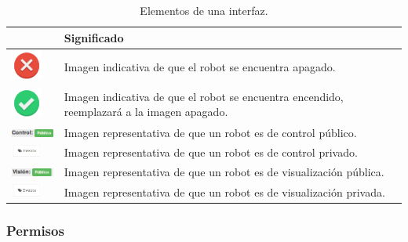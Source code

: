 \begin{table}[H]
  \begin{center}
    \begin{tabular}{|p{2cm}|p{10cm}|}
      \hline
      \centering{Elemento} & \qquad \quad Significado \\
      \hline
      \includegraphics[width=1cm]{imagenes/manual-usuario/offline.png} & Imagen indicativa de que el robot se encuentra apagado. \\
      \hline
      \includegraphics[width=1cm]{imagenes/manual-usuario/online.png} & Imagen indicativa de que el robot se encuentra encendido, reemplazará a la imagen apagado. \\
      \hline
      \includegraphics[width=2cm]{imagenes/manual-usuario/control-publico.png} & Imagen representativa de que un robot es de control público. \\
      \hline
      \includegraphics[width=1cm]{imagenes/manual-usuario/nuevo-evento.png} & Imagen representativa de que un robot es de control privado. \\
      \hline
      \includegraphics[width=2cm]{imagenes/manual-usuario/vision-publico.png} & Imagen representativa de que un robot es de visualización pública. \\
      \hline
      \includegraphics[width=1cm]{imagenes/manual-usuario/nuevo-evento.png} & Imagen representativa de que un robot es de visualización privada. \\
      \hline
    \end{tabular}
  \end{center}
\caption{Elementos de una interfaz.}
\end{table}


\subsubsection{Permisos}



